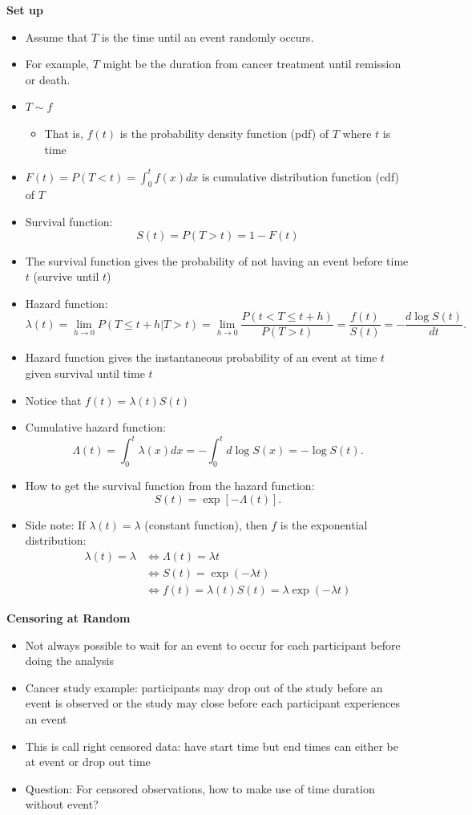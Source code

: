 \documentclass[
]{article}
\providecommand{\tightlist}{%
  \setlength{\itemsep}{0pt}\setlength{\parskip}{0pt}}
\begin{document}
\textbf{Set up}

\begin{itemize}
\item
  Assume that \(T\) is the time until an event randomly occurs.
\item
  For example, \(T\) might be the duration from cancer treatment until
  remission or death.
\item
  \(T\sim f\)

  \begin{itemize}
  \tightlist
  \item
    That is, \(f(t)\) is the probability density function (pdf) of \(T\)
    where \(t\) is time
  \end{itemize}
\item
  \(F(t)=P(T<t)=\int_0^tf(x)dx\) is cumulative distribution function
  (cdf) of \(T\)
\item
  Survival function: \[S(t)=P(T>t)=1-F(t)\]
\item
  The survival function gives the probability of not having an event
  before time \(t\) (survive until \(t\))
\item
  Hazard function: \[
  \lambda(t) =\lim_{h\rightarrow 0} P(T\leq t+h | T>t) =\lim_{h\rightarrow 0} \frac{P(t<T\leq t+h)}{P(T>t)}= \frac{f(t)}{S(t)} = -\frac{d\log S(t)}{dt}.
  \]
\item
  Hazard function gives the instantaneous probability of an event at
  time \(t\) given survival until time \(t\)
\item
  Notice that \(f(t)=\lambda(t)S(t)\)
\item
  Cumulative hazard function: \[
  \Lambda(t)= \int_0^t\lambda(x)dx=-\int_0^td\log S(x)=-\log S(t).
  \]
\item
  How to get the survival function from the hazard function: \[
  S(t)=\exp[-\Lambda(t)].
  \]
\item
  Side note: If \(\lambda(t)=\lambda\) (constant function), then \(f\)
  is the exponential distribution: \[
  \begin{align*}
  \lambda(t)=\lambda 
  &\Leftrightarrow \Lambda(t)=\lambda t \\
  &\Leftrightarrow S(t)=\exp(-\lambda t) \\
  &\Leftrightarrow f(t)= \lambda(t) S(t) = \lambda\exp(-\lambda t)
  \end{align*}
  \]
\end{itemize}

\textbf{Censoring at Random}

\begin{itemize}
\item
  Not always possible to wait for an event to occur for each participant
  before doing the analysis
\item
  Cancer study example: participants may drop out of the study before an
  event is observed or the study may close before each participant
  experiences an event
\item
  This is call right censored data: have start time but end times can
  either be at event or drop out time
\item
  Question: For censored observations, how to make use of time duration
  without event?
\end{itemize}
\end{document}
